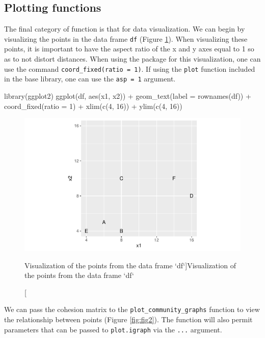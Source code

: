 \hypertarget{plotting-functions}{%
\subsection{Plotting functions}\label{plotting-functions}}

The final category of function is that for data visualization. We can
begin by visualizing the points in the data frame \texttt{df} (Figure
\ref{fig:fig1}). When visualizing these points, it is important to have
the aspect ratio of the x and y axes equal to 1 so as to not distort
distances. When using the  package for this
visualization, one can use the command
\texttt{coord\_fixed(ratio\ =\ 1)}. If using the \texttt{plot} function
included in the base library, one can use the \texttt{asp\ =\ 1}
argument.

\begin{Schunk}
\begin{Sinput}
library(ggplot2)
ggplot(df, aes(x1, x2)) +
  geom_text(label = rownames(df)) +
  coord_fixed(ratio = 1) +
  xlim(c(4, 16)) +
  ylim(c(4, 16))
\end{Sinput}
\begin{figure}[H]
\begin{center}
\includegraphics[width=5in]{dagostino-mcgowan_files/figure-latex/fig1-1} \caption[Visualization of the points from the data frame `df`]{Visualization of the points from the data frame `df`}\label{fig:fig1}
\end{center}
\end{figure}
\end{Schunk}

We can pass the cohesion matrix to the \texttt{plot\_community\_graphs}
function to view the relationship between points (Figure
\ref{fig:fig2}). The function will also permit parameters that can be
passed to \texttt{plot.igraph} via the \texttt{...} argument.

